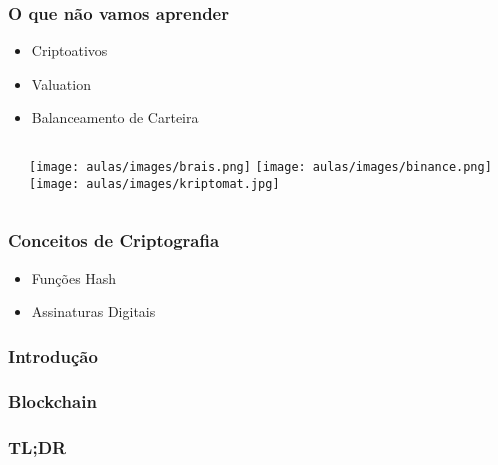 \documentclass{beamer}
\begin{document}
\begin{frame}
\frametitle{O que não vamos aprender}

\begin{itemize}
    \item Criptoativos
    \item Valuation
    \item Balanceamento de Carteira
\end{itemize}


\begin{columns}[T] %

    \begin{column}{0.7\textwidth} %

    \end{column}
    \begin{column}{0.25\textwidth}
        \texttt{[image: aulas/images/brais.png]}
        \vspace{0.5cm} %
        \texttt{[image: aulas/images/binance.png]}
        \vspace{0.5cm}
         \texttt{[image: aulas/images/kriptomat.jpg]}
    \end{column}
\end{columns}

\end{frame}

\begin{frame}
  \frametitle{Conceitos de Criptografia}
\begin{itemize}
    \item Funções Hash
    \item Assinaturas Digitais
\end{itemize}
\end{frame}

\begin{frame}
\frametitle{Introdução}

\end{frame}

\begin{frame}
    \frametitle{Blockchain}
\end{frame}


\begin{frame}
    \frametitle{TL;DR}
    \begin{center}
    \end{center}
\end{frame}
\end{document}
